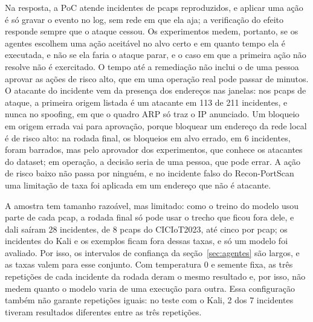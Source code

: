 Na resposta, a PoC atende incidentes de pcaps reproduzidos, e aplicar uma ação é só gravar o evento no log, sem rede em que ela aja; a verificação do efeito responde sempre que o ataque cessou. Os experimentos medem, portanto, se os agentes escolhem uma ação aceitável no alvo certo e em quanto tempo ela é executada, e não se ela faria o ataque parar, e o caso em que a primeira ação não resolve não é exercitado. O tempo até a remediação não inclui o de uma pessoa aprovar as ações de risco alto, que em uma operação real pode passar de minutos. O atacante do incidente vem da presença dos endereços nas janelas: nos pcaps de ataque, a primeira origem listada é um atacante em 113 de 211 incidentes, e nunca no spoofing, em que o quadro ARP só traz o IP anunciado. Um bloqueio em origem errada vai para aprovação, porque bloquear um endereço da rede local é de risco alto: na rodada final, os bloqueios em alvo errado, em 6 incidentes, foram barrados, mas pelo aprovador dos experimentos, que conhece os atacantes do dataset; em operação, a decisão seria de uma pessoa, que pode errar. A ação de risco baixo não passa por ninguém, e no incidente falso do Recon-PortScan uma limitação de taxa foi aplicada em um endereço que não é atacante.

A amostra tem tamanho razoável, mas limitado: como o treino do modelo usou parte de cada pcap, a rodada final só pode usar o trecho que ficou fora dele, e dali saíram 28 incidentes, de 8 pcaps do CICIoT2023, até cinco por pcap; os incidentes do Kali e os exemplos ficam fora dessas taxas, e só um modelo foi avaliado. Por isso, os intervalos de confiança da seção~\ref{sec:agentes} são largos, e as taxas valem para esse conjunto. Com temperatura 0 e semente fixa, as três repetições de cada incidente da rodada deram o mesmo resultado e, por isso, não medem quanto o modelo varia de uma execução para outra. Essa configuração também não garante repetições iguais: no teste com o Kali, 2 dos 7 incidentes tiveram resultados diferentes entre as três repetições.
